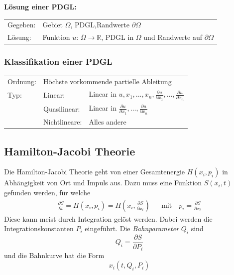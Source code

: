 \textbf{Lösung einer PDGL:}\\
\begin{tabular}{ll}
Gegeben:& Gebiet $\Omega$, PDGL,Randwerte $\partial\Omega$\\
Lösung:& Funktion $u$: $\overset{\_}{\Omega}\rightarrow \mathbb{R}$, PDGL in $\Omega$ und Randwerte auf $\partial\Omega$\\
\end{tabular}

\subsubsection{Klassifikation einer PDGL}
\begin{tabular}{lll}
Ordnung:& \multicolumn{2}{l}{Höchste vorkommende partielle Ableitung}\\
Typ:& Linear: & Linear in $u, x_1,...,x_n, \frac{\partial u}{\partial x_1},\ldots,\frac{\partial u}{\partial x_n}$\\
& Quasilinear: &  Linear in $\frac{\partial u}{\partial x_1},\ldots,\frac{\partial u}{\partial x_n}$\\
& Nichtlineare: & Alles andere
\end{tabular}




\subsection{Hamilton-Jacobi Theorie}
Die Hamilton-Jacobi Theorie geht von einer Gesamtenergie $H(x_i,p_i)$ in Abhängigkeit von Ort
und Impuls aus.
Dazu muss eine Funktion $S(x_i,t)$ gefunden werden, für welche
\begin{align*}
    \frac{\partial S}{\partial t} = H\left(x_i,p_i\right) = H\left(x_i,\frac{\partial S}{\partial x_i}\right)
    && \text{mit} \quad
    p_i = \frac{\partial S}{\partial x_i}
\end{align*}
Diese kann meist durch Integration gelöst werden.
Dabei werden die Integrationskonstanten $P_i$ eingeführt.
Die \emph{Bahnparameter} $Q_i$ sind
\[
    Q_i = \frac{\partial S}{\partial P_i}
\]
und die Bahnkurve hat die Form
\[
    x_i(t,Q_i,P_i)
\]





%



